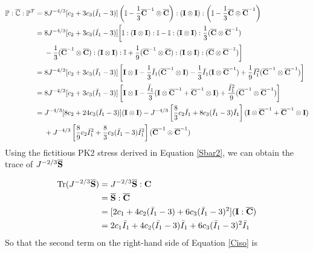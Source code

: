 \begin{equation} \label{part12}
\begin{split}
\mathbb{P} : \overline{\mathbb{C}} : {\mathbb{P}}^T 
= {}& 8J^{-4/3}[c_2 + 3c_3({\bar{I}}_1 - 3 )] \left( \mathbb{I} - \frac{1}{3}{\overline{\bold{C}}}^{-1} \otimes {\overline{\bold{C}}} \right) : (\bold{I} \otimes \bold{I}): \left(\mathbb{I} - \frac{1}{3}{\overline{\bold{C}}} \otimes {\overline{\bold{C}}}^{-1}\right) \\
= {}& 8J^{-4/3}[c_2 + 3c_3({\bar{I}}_1 - 3 )] \bigg[\mathbb{I}:(\bold{I} \otimes \bold{I}):\mathbb{I} - \mathbb{I}:(\bold{I} \otimes \bold{I}): \frac{1}{3} ({\overline{\bold{C}}} \otimes {\overline{\bold{C}}}^{-1}) \\
&- \frac{1}{3} ({\overline{\bold{C}}}^{-1} \otimes {\overline{\bold{C}}}) : (\bold{I} \otimes \bold{I}) : \mathbb{I} +  \frac{1}{9} ({\overline{\bold{C}}}^{-1} \otimes {\overline{\bold{C}}}) : (\bold{I} \otimes \bold{I}) : ({\overline{\bold{C}}} \otimes {\overline{\bold{C}}}^{-1}) \bigg] \\
= {}& 8J^{-4/3}[c_2 + 3c_3({\bar{I}}_1 - 3 )] \left[ \bold{I} \otimes \bold{I} - \frac{1}{3}\bar{I}_1({\overline{\bold{C}}}^{-1} \otimes \bold{I}) - \frac{1}{3}\bar{I}_1 (\bold{I} \otimes {\overline{\bold{C}}}^{-1}) + \frac{1}{9}{\bar{I}_1}^2({\overline{\bold{C}}}^{-1} \otimes {\overline{\bold{C}}}^{-1}) \right] \\
= {}& 8J^{-4/3} [c_2 + 3c_3({\bar{I}}_1 - 3 )] \left[ \bold{I} \otimes \bold{I} - \frac{{\bar{I}}_1}{3}(\bold{I} \otimes {\overline{\bold{C}}}^{-1} +{\overline{\bold{C}}}^{-1}  \otimes  \bold{I}) + \frac{{{\bar{I}}_1}^2}{9} ({\overline{\bold{C}}}^{-1} \otimes {\overline{\bold{C}}}^{-1}) \right] \\
= {}&  J^{-4/3}[8c_2 + 24c_3({\bar{I}}_1 - 3 )] (\bold{I} \otimes \bold{I} ) -  J^{-4/3} \left[ \frac{8}{3}c_2{\bar{I}}_1 + 8c_3({\bar{I}}_1 - 3 ){\bar{I}}_1 \right] (\bold{I} \otimes {\overline{\bold{C}}}^{-1} +{\overline{\bold{C}}}^{-1}  \otimes  \bold{I}) \\
&+
J^{-4/3} \left[ \frac{8}{9}c_2{\bar{I}_1}^2 + \frac{8}{3}c_3({\bar{I}}_1 - 3 ){\bar{I}_1}^2 \right] ({\overline{\bold{C}}}^{-1} \otimes {\overline{\bold{C}}}^{-1})
\end{split}
\end{equation}
Using the fictitious PK2 stress derived in Equation \ref{Sbar2}, we can obtain the trace of $J^{-2/3}\overline{\bold{S}}$

\begin{equation}
\begin{split}
\mathrm{Tr}(J^{-2/3}\overline{\bold{S}}) &= J^{-2/3}\overline{\bold{S}}:\bold{C} \\
&= \overline{\bold{S}} : \overline{\bold{C}} \\
&=  [2c_1 + 4c_2(\bar{I}_1 - 3) + 6c_3(\bar{I}_1 - 3)^2] (\bold{I} : \overline{\bold{C}}) \\
&= 2c_1\bar{I}_1 + 4c_2(\bar{I_1} - 3)\bar{I}_1 + 6c_3(\bar{I}_1 - 3)^2\bar{I}_1
\end{split}
\end{equation}
So that the second term on the right-hand side of Equation \ref{Ciso} is

